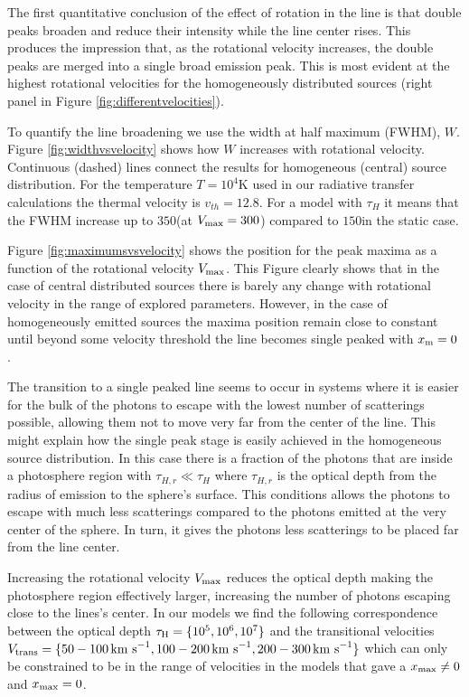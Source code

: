\documentclass{emulateapj}
\newcommand{\ly}{{\ifmmode{{\rm Ly}\alpha~}\else{Ly$\alpha$~}\fi}}
\newcommand{\kms}{{\ifmmode{{\mathrm{\,km\ s}^{-1}}}\else{\,km~s$^{-1}$}\fi}}
\begin{document}
The first quantitative conclusion of the effect of rotation in the
\ly line is that double peaks broaden and reduce their intensity
while the line center rises. This produces the impression that, as the
rotational velocity increases, the double peaks are merged into a
single broad emission peak. This is most evident at the highest
rotational velocities for the homogeneously distributed sources
(right panel in Figure \ref{fig:differentvelocities}). 

To quantify the line broadening we use the width at half maximum
(FWHM), $W$. Figure \ref{fig:widthvsvelocity} shows how $W$ increases
with rotational velocity. Continuous (dashed) lines connect the
results for homogeneous (central) source distribution. For the
temperature $T=10^4$K used in our radiative transfer calculations the
thermal velocity is $v_{th}=12.8$\kms. For a model with $\tau_{H}$ it
means that the FWHM increase up to $350$\kms (at $V_{\rm
  max}=300$\kms) compared to $150$\kms in the static case.   

Figure \ref{fig:maximumsvsvelocity} shows the position for the peak
maxima as a function of the rotational velocity $V_{\rm max}$. This
Figure clearly shows that in the case of central distributed
sources there is barely any change with rotational velocity in the
range of explored parameters. However, in the case of
homogeneously emitted sources the maxima position remain close to
constant until beyond some velocity threshold the line becomes single
peaked with $x_{\rm m}=0$ \kms. 

The transition to a single peaked line seems to occur in systems
where it is easier for the bulk of the photons to escape with the lowest
number of scatterings possible, allowing them not to move very far
from the center of the line. This might explain how the single peak stage
is easily achieved in the homogeneous source distribution. In this
case there is a fraction of the photons that are inside a photosphere
region with $\tau_{H,r}\ll \tau_{H}$ where $\tau_{H,r}$ is the optical
depth from the radius of emission to the sphere's surface. This
conditions allows the photons to escape with much less scatterings
compared to the photons emitted at the very center of the sphere. In
turn, it gives the photons less scatterings to be placed far from the
line center. 

Increasing the rotational velocity $V_{\rm max}$ reduces
the optical depth making the photosphere region effectively larger,
increasing the number of photons escaping close to the lines's
center. In our models we find the following correspondence between the
optical depth $\tau_{\rm H}=\{10^5, 10^6, 10^7\}$ and the transitional
velocities $V_{\rm   trans}=\{50-100\kms, 100-200\kms, 200-300\kms\}$
which can only be constrained to be in the range of velocities in the
models that gave a $x_{\rm max}\neq 0$ and $x_{\rm max}=0$.  
\end{document}
